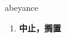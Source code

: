 
\begin{frame}
{\huge abeyance}
\begin{center}
\begin{enumerate}\Large
  \item \textbf{中止，搁置}
\end{enumerate}
\end{center}
\end{frame}
